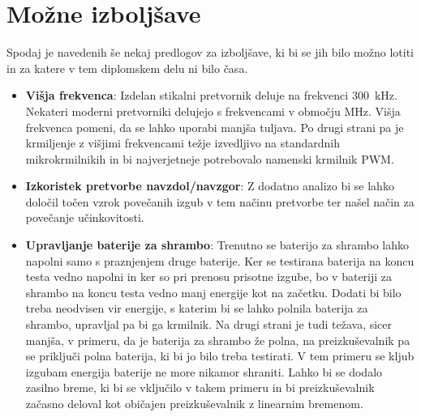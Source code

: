 \documentclass[a4paper,twoside,openright,12pt,slovene]{book}
\begin{document}
\section{Možne izboljšave} \label{sec:mozne-izboljsave}
Spodaj je navedenih še nekaj predlogov za izboljšave, ki bi se jih bilo možno lotiti in za katere v tem diplomskem delu ni bilo časa.
\begin{itemize}
    \item \textbf{Višja frekvenca}: Izdelan stikalni pretvornik deluje na frekvenci 300~kHz.
    Nekateri moderni pretvorniki delujejo s frekvencami v območju MHz. Višja frekvenca pomeni, da se lahko uporabi manjša tuljava.
    Po drugi strani pa je krmiljenje z višjimi frekvencami težje izvedljivo na standardnih mikrokrmilnikih in bi najverjetneje potrebovalo namenski krmilnik PWM.\@
    \item \textbf{Izkoristek pretvorbe navzdol/navzgor}: Z dodatno analizo bi se lahko določil točen vzrok povečanih izgub v tem načinu pretvorbe ter našel način za povečanje učinkovitosti.
    \item \textbf{Upravljanje baterije za shrambo}: Trenutno se baterijo za shrambo lahko napolni samo s praznjenjem druge baterije.
    Ker se testirana baterija na koncu testa vedno napolni in ker so pri prenosu prisotne izgube, bo v bateriji za shrambo na koncu testa vedno manj energije kot na začetku.
    Dodati bi bilo treba neodvisen vir energije, s katerim bi se lahko polnila baterija za shrambo, upravljal pa bi ga krmilnik.
    Na drugi strani je tudi težava, sicer manjša, v primeru, da je baterija za shrambo že polna, na preizkuševalnik pa se priključi polna baterija, ki bi jo bilo treba testirati.
    V tem primeru se kljub izgubam energija baterije ne more nikamor shraniti.
    Lahko bi se dodalo zasilno breme, ki bi se vključilo v takem primeru in bi preizkuševalnik začasno deloval kot običajen preizkuševalnik z linearnim bremenom.
\end{itemize}


\cleardoublepage{}%



\end{document}
